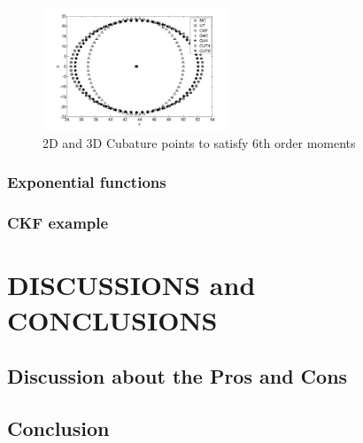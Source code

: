 \documentclass[letterpaper, 10 pt, conference]{ieeeconf}  %
\begin{document}
   \begin{figure}[thpb]
      \centering
      \includegraphics[width=0.5\textwidth]{polartocart}
      \caption{2D and 3D Cubature points to satisfy 6th order moments}
      \label{fig:23d4m1}
   \end{figure} 

\subsubsection{Exponential functions}

\subsubsection{CKF example}


\addtolength{\textheight}{-3cm}   %


\section{DISCUSSIONS and CONCLUSIONS}

\subsection{Discussion about the Pros and Cons}

\subsection{Conclusion}
\end{document}
